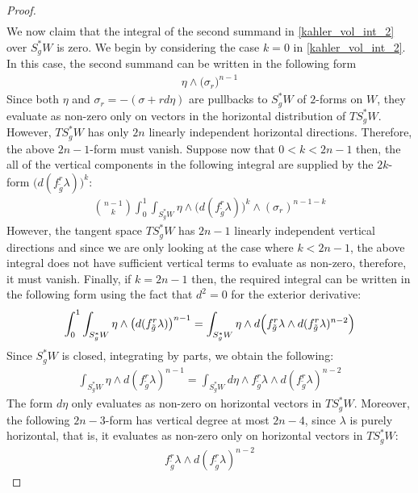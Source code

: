 \documentclass[11pt]{amsart}
\theoremstyle{plain}
\theoremstyle{definition}
\theoremstyle{remark}
\begin{document}
\begin{proof}
\begin{align}
\end{align}
We now claim that the integral of the second summand in \eqref{kahler_vol_int_2} over $S^*_gW$ is zero. We begin by considering the case $k=0$ in \eqref{kahler_vol_int_2}. In this case, the second summand can be written in the following form
\begin{align}\label{eta_wedge_vol_1}
    \eta \wedge \big(\sigma_r \big)^{n-1}
\end{align}
Since both $\eta$ and $\sigma_r= -(\sigma + rd\eta)$ are pullbacks to $S_g^*W$ of $2$-forms on $W$, they evaluate as non-zero only on vectors in the horizontal distribution of $TS_g^*W$. However, $TS^*_gW$ has only $2n$ linearly independent horizontal directions. Therefore, the above $2n-1$-form must vanish. Suppose now that $0< k< 2n-1$ then, the all of the vertical components in the following integral are supplied by the $2k$-form $\big(d(f^r_{\tilde g}\lambda)\big)^k$:
\begin{align}
    \binom{n-1}{k} \int^1_0\int_{S^*_gW} \eta \wedge \big(d(f^r_{\tilde g}\lambda)\big)^k \wedge (\sigma_r)^{n-1-k}
\end{align}
However, the tangent space $TS^*_gW$ has $2n-1$ linearly independent vertical directions and since we are only looking at the case where $k<2n-1$, the above integral does not have sufficient vertical terms to evaluate as non-zero, therefore, it must vanish. Finally, if $k=2n-1$ then, the required integral can be written in the following form using the fact that $d^2=0$ for the exterior derivative:
\begin{align}
    \int^1_0\int_{S^*_gW} \eta \wedge \big(d(f^r_{\tilde g}\lambda)\big)^{n-1}=
\int_{S^*_gW}
\eta\wedge
d\Bigl(
f^{r}_{\tilde g}\lambda\wedge d(f^{r}_{\tilde g}\lambda)^{n-2}
\Bigr)
\end{align}
Since $S^*_gW$ is closed, integrating by parts, we obtain the following:
\begin{align}\label{mag_vol_general_1}
    \int_{S_g^*W}
\eta\wedge d(f^{r}_{\tilde g}\lambda)^{n-1}
=
\int_{S_g^*W}
d\eta\wedge f^{r}_{\tilde g}\lambda\wedge d(f^{r}_{\tilde g}\lambda)^{n-2}
\end{align}
The form $d\eta$ only evaluates as non-zero on horizontal vectors in $TS^*_gW$. Moreover, the following $2n-3$-form has vertical degree at most $2n-4$, since $\lambda$ is purely horizontal, that is, it evaluates as non-zero only on horizontal vectors in $TS^*_gW$:
\begin{align}
    f^{r}_{\tilde g}\lambda\wedge d(f^{r}_{\tilde g}\lambda)^{n-2}
\end{align}

\end{proof}
\end{document}
